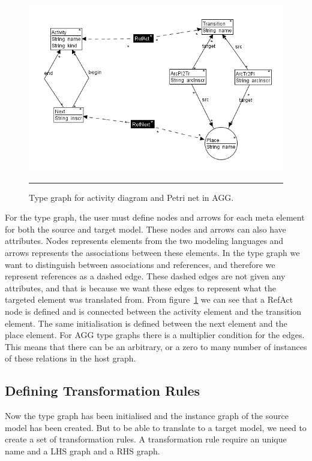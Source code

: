 \begin{figure}[H]
	\centering
	\includegraphics[scale=0.7]{figures/AggTypeGraph.png}
	\rule{35em}{0.5pt}
	\caption[Type graph in AGG]
	{Type graph for activity diagram and Petri net in AGG.}
	\label{fig:AggTypeGraph}
\end{figure}

For the type graph, the user must define nodes and arrows for each meta
element for both the source and target model. These nodes and arrows can also
have attributes. Nodes represents elements from the two modeling languages and
arrows represents the associations between these elements. In the type graph we
want to distinguish between associations and references, and therefore we
represent references as a dashed edge. These dashed edges are not given any
attributes, and that is because we want these edges to represent what the
targeted element was translated from. From figure~\ref{fig:AggTypeGraph} we can
see that a RefAct node is defined and is connected between the activity
element and the transition element. The same initialisation is defined between
the next element and the place element. For AGG type graphs there is a
multiplier condition for the edges. This means that there can be an arbitrary,
or a zero to many number of instances of these relations in the host graph.

\subsection{Defining Transformation Rules}
Now the type graph has been initialised and the instance graph of the
source model has been created. But to be able to translate to a target model,
we need to create a set of transformation rules. A transformation rule
require an unique name and a LHS graph and a RHS graph. 


